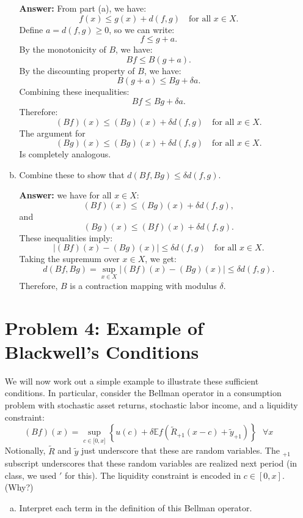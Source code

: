 \documentclass[11pt]{extarticle}
\theoremstyle{plain}
\theoremstyle{definition}
\begin{document}
\begin{enumerate}[(a)]
\begin{enumerate}[(a)]
\textbf{Answer:} 
From part (a), we have:
\[
f(x) \leq g(x) + d(f, g) \quad \text{for all } x \in X.
\]
Define $a = d(f, g) \geq 0$, so we can write:
\[
f \leq g + a.
\]
By the monotonicity of $B$, we have:
\[
Bf \leq B(g + a).
\]
By the discounting property of $B$, we have:
\[
B(g + a) \leq Bg + \delta a.
\]
Combining these inequalities:
\[
Bf \leq Bg + \delta a.
\]
Therefore:
\[
(Bf)(x) \leq (Bg)(x) + \delta d(f, g) \quad \text{for all } x \in X.
\]
The argument for 
\[
(Bg)(x) \leq (Bg)(x) + \delta d(f, g) \quad \text{for all } x \in X.
\]
Is completely analogous.
\item Combine these to show that $d(Bf, Bg) \leq \delta d(f, g)$. 

\textbf{Answer:} we have for all $x \in X$:
\[
(Bf)(x) \leq (Bg)(x) + \delta d(f, g),
\]
and
\[
(Bg)(x) \leq (Bf)(x) + \delta d(f, g).
\]
These inequalities imply:
\[
|(Bf)(x) - (Bg)(x)| \leq \delta d(f, g) \quad \text{for all } x \in X.
\]
Taking the supremum over $x \in X$, we get:
\[
d(Bf, Bg) = \sup_{x \in X} |(Bf)(x) - (Bg)(x)| \leq \delta d(f, g).
\]
Therefore, $B$ is a contraction mapping with modulus $\delta$.
\end{enumerate}


\vspace{5mm}
\section*{Problem 4: Example of Blackwell's Conditions}

We will now work out a simple example to illustrate these sufficient conditions. In particular, consider the Bellman operator in a consumption problem with stochastic asset returns, stochastic labor income, and a liquidity constraint:
\begin{equation*}
	(Bf)(x)=\sup_{c\in \lbrack 0,x]}\left\{ u(c)+\delta \mathbb Ef(\tilde{R}_{+1}(x-c)+
	\tilde{y}_{+1})\right\} \text{ \ }\forall x\text{\ } 
\end{equation*}
Notionally, $\tilde R$ and $\tilde y$ just underscore that these are random variables. The $_{+1}$ subscript underscores that these random variables are realized next period (in class, we used $'$ for this). The liquidity constraint is encoded in $c \in [0, x]$. (Why?)


\vspace{5mm}
\noindent
\begin{enumerate}[(a)]
\item Interpret each term in the definition of this Bellman operator.


\end{enumerate}
\end{enumerate}
\end{document}
